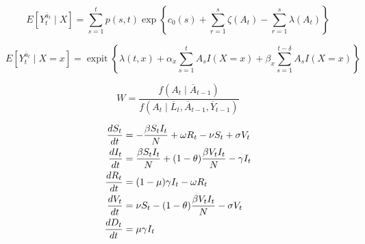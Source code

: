 \documentclass[11pt]{article}
\begin{document}
\clearpage
\newpage
$$
E[Y_t^{\overline{a}_t} \mid X] = \sum_{s=1}^t p(s, t) \operatorname{exp}\left\{c_0(s) + \sum_{r=1}^s \zeta(A_t) - \sum_{r=1}^s \lambda(A_t)\right\}
$$


$$
E[Y_t^{\overline{a}_t} \mid X = x] = \operatorname{expit}\left\{\lambda(t,x) + \alpha_x \sum_{s=1}^{t}A_sI(X = x) + \beta_x \sum_{s=1}^{t-\delta}A_sI(X = x) \right\}
$$

$$
W = \frac{f(A_t \mid \overline{A}_{t-1})}{f(A_t \mid \overline{L}_t, \overline{A}_{t-1}, \overline{Y}_{t-1})}
$$



\begin{align}
    \begin{split}\label{eqn:sirv}
    \frac{d{S_t}}{d{t}} &=  - \frac{\beta S_t I_t}{N} + \omega R_t - \nu S_t + \sigma V_t \\
    \frac{d{I_t}}{d{t}} &=  \frac{\beta S_tI_t}{N} + (1 - \theta) \frac{\beta V_t I_t}{N} - \gamma I_t \\
    \frac{d{R_t}}{d{t}} &=  (1 - \mu) \gamma I_t - \omega R_t \\
    \frac{d{V_t}}{d{t}} &=  \nu S_t - (1 - \theta) \frac{\beta V_t I_t}{N}  - \sigma V_t \\
    \frac{d{D_t}}{d{t}} &=  \mu \gamma I_t \\
    \end{split}
\end{align}


\end{document}
